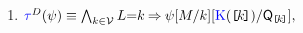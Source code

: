 \begin{minipage}[t]{.55\textwidth}
  \begin{enumerate}[resume,topsep=0pt,label=(\textsc{w}\arabic*),ref=\textsc{w}\arabic*]
  \item
    \begin{math}
      \aTr{\bEvs}{\bForm} \riff
      \textstyle\bigwedge_{\dVal\in\Val}
      \cExp{=}\dVal
      \limplies
        \bForm
        [\aExp/{\dVal}]
        [\kappaE{\REF{\dVal}}/\Q{\REF{\dVal}}],
      \end{math}

\end{enumerate}
\end{minipage}
